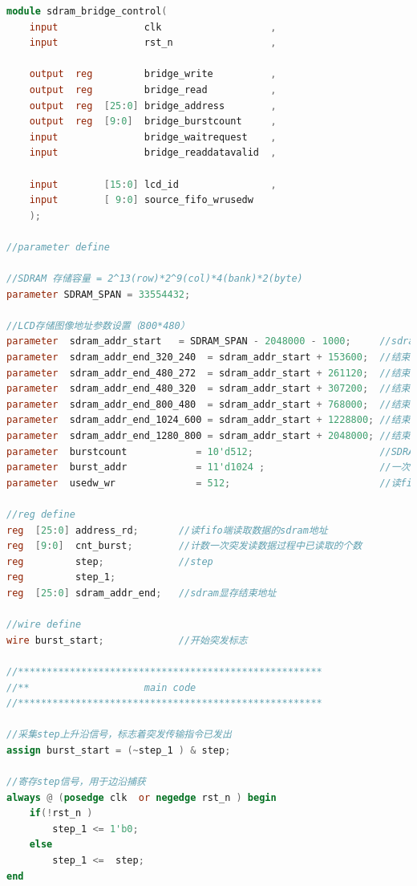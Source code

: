 \documentclass[12pt,hyperref,a4paper,UTF8]{ctexart}
\begin{document}
\begin{lstlisting}[language=Verilog]
module sdram_bridge_control(
    input               clk                   ,
    input               rst_n                 ,
    
    output  reg         bridge_write          ,
    output  reg         bridge_read           ,
    output  reg  [25:0] bridge_address        ,
    output  reg  [9:0]  bridge_burstcount     ,
    input               bridge_waitrequest    ,
    input               bridge_readdatavalid  ,
    
    input        [15:0] lcd_id                ,
    input        [ 9:0] source_fifo_wrusedw
    );

//parameter define

//SDRAM 存储容量 = 2^13(row)*2^9(col)*4(bank)*2(byte)
parameter SDRAM_SPAN = 33554432;

//LCD存储图像地址参数设置（800*480）
parameter  sdram_addr_start   = SDRAM_SPAN - 2048000 - 1000;     //sdram显存起始地址;
parameter  sdram_addr_end_320_240  = sdram_addr_start + 153600;  //结束地址（320*240）
parameter  sdram_addr_end_480_272  = sdram_addr_start + 261120;  //结束地址（480*272）
parameter  sdram_addr_end_480_320  = sdram_addr_start + 307200;  //结束地址（480*320）
parameter  sdram_addr_end_800_480  = sdram_addr_start + 768000;  //结束地址（800*480）
parameter  sdram_addr_end_1024_600 = sdram_addr_start + 1228800; //结束地址（1024*600）
parameter  sdram_addr_end_1280_800 = sdram_addr_start + 2048000; //结束地址（1280*800）
parameter  burstcount            = 10'd512;                      //SDRAM 突发长度
parameter  burst_addr            = 11'd1024 ;                    //一次突发的地址长度
parameter  usedw_wr              = 512;                          //读fifo的数据深度

//reg define
reg  [25:0] address_rd;       //读fifo端读取数据的sdram地址
reg  [9:0]  cnt_burst;        //计数一次突发读数据过程中已读取的个数
reg         step;             //step
reg         step_1;
reg  [25:0] sdram_addr_end;   //sdram显存结束地址

//wire define 
wire burst_start;             //开始突发标志

//*****************************************************
//**                    main code
//*****************************************************

//采集step上升沿信号，标志着突发传输指令已发出
assign burst_start = (~step_1 ) & step;

//寄存step信号，用于边沿捕获
always @ (posedge clk  or negedge rst_n ) begin 
    if(!rst_n ) 
        step_1 <= 1'b0;
    else    
        step_1 <=  step;  
end


\end{lstlisting}
\end{document}
